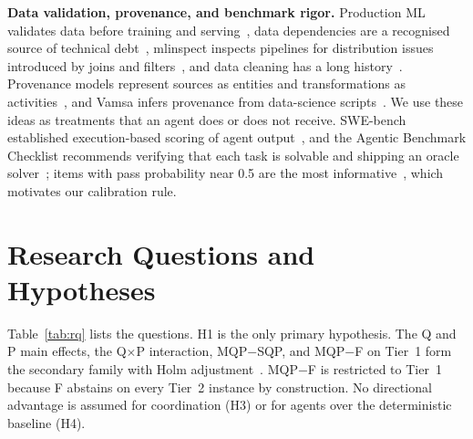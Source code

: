 \documentclass[conference]{IEEEtran}
\newcommand{\sys}[1]{\textsf{#1}}
\begin{document}
\textbf{Data validation, provenance, and benchmark rigor.}
Production ML validates data before training and serving~\cite{polyzotis2019datavalidation,schelter2018deequ}, data
dependencies are a recognised source of technical debt~\cite{sculley2015debt}, mlinspect inspects pipelines for
distribution issues introduced by joins and filters~\cite{grafberger2021mlinspect}, and data cleaning has a long
history~\cite{rekatsinas2017holoclean}. Provenance models represent sources as entities and transformations as
activities~\cite{w3c2013provdm}, and Vamsa infers provenance from data-science scripts~\cite{namaki2020vamsa}. We use
these ideas as treatments that an agent does or does not receive. SWE-bench established execution-based scoring of
agent output~\cite{jimenez2024swebench}, and the Agentic Benchmark Checklist recommends verifying that each task is
solvable and shipping an oracle solver~\cite{zhu2025abc}; items with pass probability near 0.5 are the most
informative~\cite{wang2026dbe}, which motivates our calibration rule.

\section{Research Questions and Hypotheses}
\label{sec:rq}
Table~\ref{tab:rq} lists the questions. H1 is the only primary hypothesis. The Q and P main effects, the Q$\times$P
interaction, \sys{MQP}$-$\sys{SQP}, and \sys{MQP}$-$\sys{F} on Tier~1 form the secondary family with Holm
adjustment~\cite{holm1979}. \sys{MQP}$-$\sys{F} is restricted to Tier~1 because \sys{F} abstains on every Tier~2
instance by construction. No directional advantage is assumed for coordination (H3) or for agents over the
deterministic baseline (H4).
\end{document}
